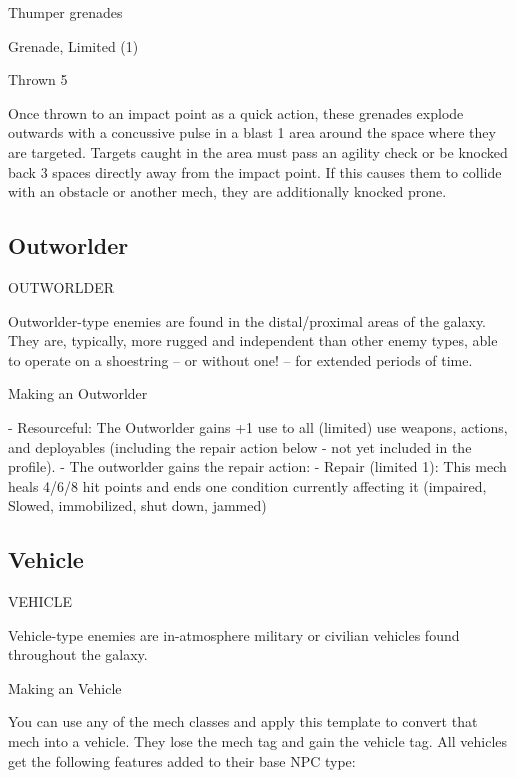 Thumper grenades
 
Grenade, Limited (1)
 
Thrown 5
 
Once thrown to an impact point as a quick action, these grenades explode outwards with a  
concussive pulse in a blast 1 area around the space where they are targeted. Targets caught in  
the area must pass an agility check or be knocked back 3 spaces directly away from the impact  
point. If this causes them to collide with an obstacle or another mech, they are additionally  
knocked prone.
 
\subsection{Outworlder}
                                            OUTWORLDER   

Outworlder-type enemies are found in the distal/proximal areas of the galaxy. They are, typically,  
more rugged and independent than other enemy types, able to operate on a shoestring -- or  
without one! -- for extended periods of time.  
 

Making an Outworlder
 

    -    Resourceful: The Outworlder gains +1 use to all (limited) use weapons, actions, and  
        deployables (including the repair action below - not yet included in the profile).  
    -   The outworlder gains the repair action:  
             -   Repair (limited 1): This mech heals 4/6/8 hit points and ends one condition  
                 currently affecting it (impaired, Slowed, immobilized, shut down, jammed)  

                                                                                                           

\subsection{Vehicle}
                                                VEHICLE   

Vehicle-type enemies are in-atmosphere military or civilian vehicles found throughout the galaxy. 
 

Making an Vehicle
 
You can use any of the mech classes and apply this template to convert that mech into a vehicle.  
They lose the mech tag and gain the vehicle tag. All vehicles get the following features added to  
their base NPC type:
 
